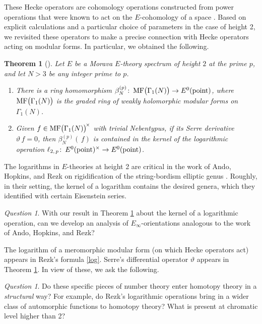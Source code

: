 \documentclass{rs}
\newtheorem{thm}[equation]{Theorem}
\theoremstyle{definition}
\theoremstyle{remark}
\newtheorem{ques}[equation]{Question}
\def\co{\colon\thinspace}
\newcommand{\pt}{{\rm point}}
\newcommand{\MF}{{\rm MF}}
\newcommand{\B}{\beta}
\newcommand{\G}{\Gamma}
\renewcommand{\=}{\approx}
\renewcommand{\-}{\sim}
\numberwithin{equation}{section}
\begin{document}
These Hecke operators are cohomology operations constructed from power 
operations that were known to act on the $E$-cohomology of a space 
\cite{Ando95}.  Based on explicit calculations and a particular choice of 
parameters in the case of height 2, we revisited these operators to make a 
precise connection with Hecke operators acting on modular forms.  In particular, 
we obtained the following.  

\begin{thm}[{\cite[Proposition 2.8 and Theorem 4.13]{ho}}]
 \label{thm:ho}
 Let $E$ be a Morava $E$-theory spectrum of height $2$ at the prime $p$, and let 
 $N > 3$ be any integer prime to $p$.  
 \begin{enumerate}[{\em (i)}]
  \item There is a ring homomorphism 
  $\B_N^{(p)} \co \MF\big(\G_1(N)\big) \to E^0(\pt)$, where 
  $\MF\big(\G_1(N)\big)$ is the graded ring of weakly holomorphic modular forms 
  on $\G_1(N)$.  

  \item Given $f \in \MF\big(\G_1(N)\big)^{\!\times}$ with trivial Nebentypus, 
  if its Serre derivative $\vartheta \, f = 0$, then $\B_N^{(p)}(\,f)$ is 
  contained in the kernel of the logarithmic operation 
  $\ell_{2,\,p} \co E^0(\pt)^\times \to E^0(\pt)$.  
 \end{enumerate}
\end{thm}

The logarithms in $E$-theories at height 2 are critical in the work of Ando, 
Hopkins, and Rezk on rigidification of the string-bordism elliptic genus 
\cite[Theorem 12.3]{koandtmf}.  Roughly, in their setting, the kernel of a 
logarithm contains the desired genera, which they identified with certain 
Eisenstein series.  

\begin{ques}
 With our result in Theorem \ref{thm:ho} about the kernel of a logarithmic 
 operation, can we develop an analysis of $E_\infty$-orientations analogous to 
 the work of Ando, Hopkins, and Rezk?  
\end{ques}

The logarithm of a meromorphic modular form (on which Hecke operators act) 
appears in Rezk's formula \eqref{log}.  Serre's differential operator 
$\vartheta$ appears in Theorem \ref{thm:ho}.  In view of these, we ask the 
following.  

\begin{ques}
 Do these specific pieces of number theory enter homotopy theory in a 
 {\em structural} way?  For example, do Rezk's logarithmic operations bring in a 
 wider class of automorphic functions to homotopy theory?  What is present at 
 chromatic level higher than 2?  
\end{ques}
\end{document}
